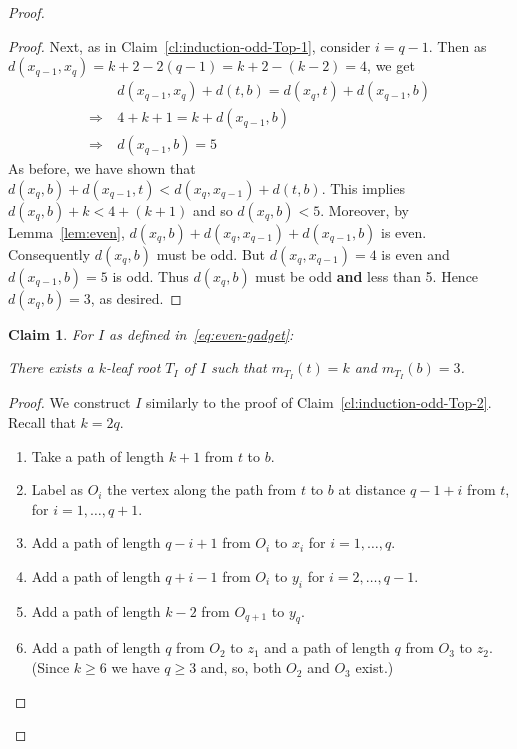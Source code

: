 \documentclass[11pt,letter]{article}
\newtheorem{claim}[theorem]{Claim}
\theoremstyle{remark}
\begin{document}
\begin{proof}
\begin{proof}
        Next, as in Claim~\ref{cl:induction-odd-Top-1}, consider $i=q-1$. Then as $d(x_{q-1}, x_q) = k + 2 - 2(q - 1) = k + 2 - (k - 2) = 4$, we get
        \begin{align*}
            &\ d(x_{q-1},x_{q})+d(t,b)=d(x_q,t)+d(x_{q-1},b)\\
            \Longrightarrow &\ 4+k+1=k+d(x_{q-1},b)\\
            \Longrightarrow &\ d(x_{q-1},b)=5
        \end{align*}
        As before, we have shown that $d(x_q,b)+d(x_{q-1},t) < d(x_q,x_{q-1})+d(t,b)$. This implies 
        $d(x_q,b)+k < 4+(k+1)$ and so $d(x_q,b)<5$. Moreover, by Lemma~\ref{lem:even}, $d(x_q,b)+d(x_q,x_{q-1})+d(x_{q-1},b)$ is even. Consequently $d(x_q,b)$ must be odd. 
        But $d(x_q,x_{q-1})=4$ is even and $d(x_{q-1},b)=5$ is odd.
        Thus $d(x_q,b)$ must be odd {\bf and} less than 5. Hence $d(x_q,b)=3$, as desired.
    \end{proof}
    \begin{claim}\label{cl:induction-even-Top-2}
        For $I$ as defined in~\ref{eq:even-gadget}:
        
        There exists a $k$-leaf root $T_I$ of $I$ such that $m_{T_I}(t)=k$ and $m_{T_I}(b)=3$.
    \end{claim}

    \begin{proof}
        We construct $I$ similarly to the proof of Claim~\ref{cl:induction-odd-Top-2}. Recall that $k=2q$.
        \begin{enumerate}
            \item Take a path of length $k+1$ from $t$ to $b$. 
            
            \item Label as $O_i$ the vertex along the path from $t$ to $b$ at distance $q-1+i$ from $t$, for $i=1,\dots, q+1$.

            \item Add a path of length $q-i+1$ from $O_i$ to $x_i$ for $i=1,\dots,q$.
                        
            \item Add a path of length $q+i-1$ from $O_i$ to $y_i$ for $i=2,\dots, q-1$.

            \item Add a path of length $k-2$ from $O_{q+1}$ to $y_q$.
            
            \item Add a path of length $q$ from $O_2$ to $z_1$ and a path of length $q$ from $O_3$ to $z_2$. (Since $k\geq 6$ we have $q\geq 3$ and, so, both $O_2$ and $O_3$ exist.)
        \end{enumerate}


\end{proof}
\end{proof}
\end{document}
